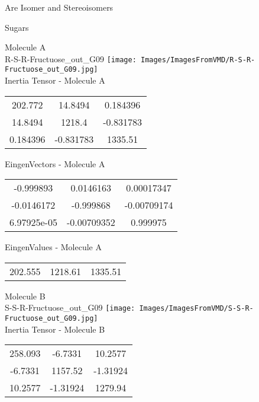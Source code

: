 \begin{center}
\vtab
\vtab
\textcolor{NavyBlue}{\Large Are Isomer and Stereoisomers}
\end{center}
\newpage

\vtab[-2cm]
\begin{center}
{\large Sugars}
\end{center}
\begin{multicols}{2}
\begin{center}
Molecule A \\ 
R-S-R-Fructuose\_out\_G09
\texttt{[image: Images/ImagesFromVMD/R-S-R-Fructuose\_out\_G09.jpg]}
\\
Inertia Tensor - Molecule A \\
\vtab
\begin{tabular}{|c c c|}
202.772	 & 	14.8494	 & 	0.184396	 \\
14.8494	 & 	1218.4	 & 	-0.831783	 \\
0.184396	 & 	-0.831783	 & 	1335.51
\end{tabular}

\vtab
 EingenVectors - Molecule A     \\
\vtab
\begin{tabular}{|c c c|}
-0.999893	 & 	0.0146163	 & 	0.00017347	 \\
-0.0146172	 & 	-0.999868	 & 	-0.00709174	 \\
6.97925e-05	 & 	-0.00709352	 & 	0.999975
\end{tabular}

\vtab
 EingenValues - Molecule A     \\
\vtab
\begin{tabular}{|c c c|}
202.555	 & 	1218.61	 & 	1335.51
\end{tabular}
\columnbreak

Molecule B \\ 
S-S-R-Fructuose\_out\_G09
\texttt{[image: Images/ImagesFromVMD/S-S-R-Fructuose\_out\_G09.jpg]}
\\
Inertia Tensor - Molecule B \\
\vtab
\begin{tabular}{|c c c|}
258.093	 & 	-6.7331	 & 	10.2577	 \\
-6.7331	 & 	1157.52	 & 	-1.31924	 \\
10.2577	 & 	-1.31924	 & 	1279.94
\end{tabular}


\end{center}
\end{multicols}
